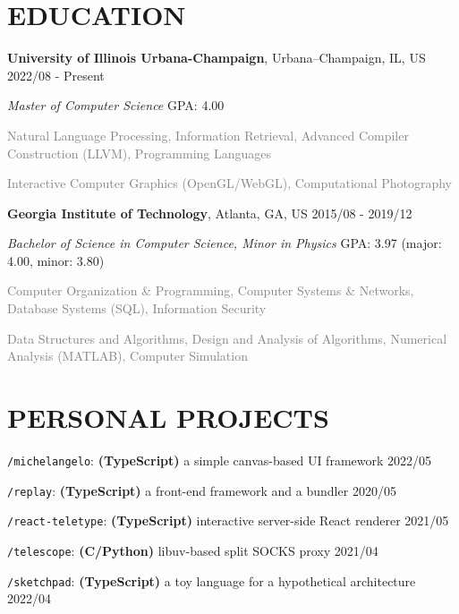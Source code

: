 \documentclass[10pt]{article}
\begin{document}
\section*{EDUCATION}
\textbf{University of Illinois Urbana-Champaign}, Urbana–Champaign, IL, US  \hfill 2022/08 - Present

\textit{Master of Computer Science}  \hfill GPA: 4.00

\vspace{0.5em}
\textcolor{gray}{Natural Language Processing, Information Retrieval, Advanced Compiler Construction (LLVM), Programming Languages}

\textcolor{gray}{Interactive Computer Graphics (OpenGL/WebGL), Computational Photography}

\vspace{1em}
\textbf{Georgia Institute of Technology}, Atlanta, GA, US \hfill 2015/08 - 2019/12

\textit{Bachelor of Science in Computer Science, Minor in Physics} \hfill GPA: 3.97 (major: 4.00, minor: 3.80)

\vspace{0.5em}
\textcolor{gray}{Computer Organization \& Programming, Computer Systems \& Networks, Database Systems (SQL), Information Security}

\textcolor{gray}{Data Structures and Algorithms, Design and Analysis of Algorithms, Numerical Analysis (MATLAB), Computer Simulation}


\section*{PERSONAL PROJECTS}

\vspace{0.5em}
\texttt{/michelangelo}: \textbf{(TypeScript)} a simple canvas-based UI framework \hfill 2022/05

\vspace{0.5em}
\texttt{/replay}: \textbf{(TypeScript)} a front-end framework and a bundler  \hfill 2020/05

\vspace{0.5em}
\texttt{/react-teletype}: \textbf{(TypeScript)} interactive server-side React renderer \hfill 2021/05

\vspace{0.5em}
\texttt{/telescope}: \textbf{(C/Python)} libuv-based split SOCKS proxy \hfill 2021/04

\vspace{0.5em}
\texttt{/sketchpad}: \textbf{(TypeScript)} a toy language for a hypothetical architecture \hfill 2022/04
\end{document}
